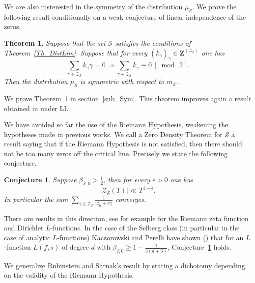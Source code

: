 \documentclass[a4paper,10pt]{amsart}
\theoremstyle{plain}
\newtheorem{conj}{Conjecture}
\newtheorem{theo}{Theorem}[section]
\theoremstyle{definition}
\begin{document}
We are also insterested in the symmetry of the distribution $\mu_{\mathcal{S}}$.
We prove the following result conditionally on a weak conjecture of linear independence of the zeros. 

\begin{theo}\label{Th_Indep_Sym}
Suppose that the set $\mathcal{S}$ satisfies the conditions of Theorem~\ref{Th_DistLim}.
Suppose that for every $(k_{\gamma})_{\gamma} \in \mathbf{Z}^{(\mathcal{Z}_{\mathcal{S}})}$ one has
$$ \sum_{\gamma \in \mathcal{Z}_{\mathcal{S}}}k_{\gamma}\gamma =0 \Rightarrow \sum_{\gamma \in \mathcal{Z}_{\mathcal{S}}}k_{\gamma}\equiv 0\ [\bmod\ 2].$$
Then the distribution $\mu_{\mathcal{S}}$ is symmetric with respect to $m_{\mathcal{S}}$.
\end{theo}

We prove Theorem~\ref{Th_Indep_Sym} in section~\ref{sub_Sym}.
This theorem improves again a result obtained in \cite{RS} under LI.

We have avoided so far the use of the Riemann Hypothesis, weakening the hypotheses made in previous works.
We call a Zero Density Theorem for $\mathcal{S}$ a result saying that if the Riemann Hypothesis is not satisfied, then there should not be too many zeros off the critical line.
Precisely we state the following conjecture.
\begin{conj}\label{Conj_ZeroDensThm}
	Suppose $\beta_{\mathcal{S},0}>\frac{1}{2}$,
	then for every $\epsilon>0$ one has
	$$\lvert\mathcal{Z}_{\mathcal{S}}(T) \rvert \ll T^{1-\epsilon}.$$
	In particular 
	the sum $\sum_{\gamma \in \mathcal{Z}_{\mathcal{S}}}\frac{1}{\lvert \beta_{0} + i\gamma\rvert}$ converges.
\end{conj}  
There are results in this direction, see for example \cite[Chap. 10]{IK} for the Riemann zeta function and Dirichlet $L$-functions. 
In the case of the Selberg class (in particular in the case of analytic $L$-functions) Kaczorowski and Perelli have shown (\cite[Lem. 3]{KP}) that for an $L$-function  $L(f,s)$ of degree $d$ with $\beta_{f,0} \geq 1 - \frac{1}{4(d+3)}$, Conjecture~\ref{Conj_ZeroDensThm} holds.

We generalize Rubinstein and Sarnak's result \cite[Th. 1.2]{RS} by stating a dichotomy depending on the validity of the Riemann Hypothesis.
\end{document}
